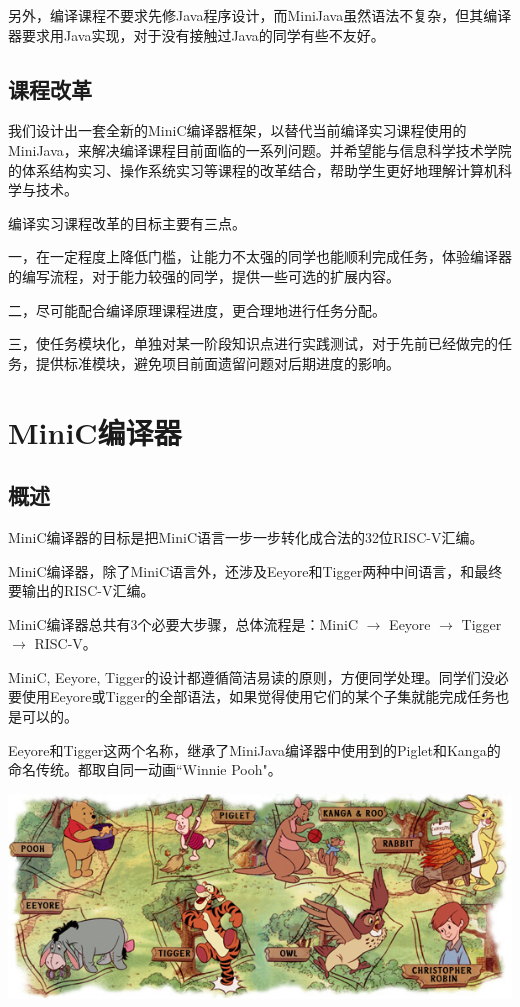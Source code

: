 \documentclass[a4paper]{ctexart}
\begin{document}
另外，编译课程不要求先修Java程序设计，而MiniJava虽然语法不复杂，但其编译器要求用Java实现，对于没有接触过Java的同学有些不友好。

\subsection{课程改革}

我们设计出一套全新的MiniC编译器框架，以替代当前编译实习课程使用的MiniJava，来解决编译课程目前面临的一系列问题。并希望能与信息科学技术学院的体系结构实习、操作系统实习等课程的改革结合，帮助学生更好地理解计算机科学与技术。

编译实习课程改革的目标主要有三点。

一，在一定程度上降低门槛，让能力不太强的同学也能顺利完成任务，体验编译器的编写流程，对于能力较强的同学，提供一些可选的扩展内容。

二，尽可能配合编译原理课程进度，更合理地进行任务分配。

三，使任务模块化，单独对某一阶段知识点进行实践测试，对于先前已经做完的任务，提供标准模块，避免项目前面遗留问题对后期进度的影响。

\newpage
\section{MiniC编译器}

\subsection{概述}

MiniC编译器的目标是把MiniC语言一步一步转化成合法的32位RISC-V汇编。

MiniC编译器，除了MiniC语言外，还涉及Eeyore和Tigger两种中间语言，和最终要输出的RISC-V汇编。

MiniC编译器总共有3个必要大步骤，总体流程是：MiniC $\rightarrow$ Eeyore $\rightarrow$ Tigger $\rightarrow$ RISC-V。

MiniC, Eeyore, Tigger的设计都遵循简洁易读的原则，方便同学处理。同学们没必要使用Eeyore或Tigger的全部语法，如果觉得使用它们的某个子集就能完成任务也是可以的。%

Eeyore和Tigger这两个名称，继承了MiniJava编译器中使用到的Piglet和Kanga的命名传统。都取自同一动画``Winnie Pooh"。

\begin{center}\includegraphics[width=15cm]{name} \end{center}
\end{document}
